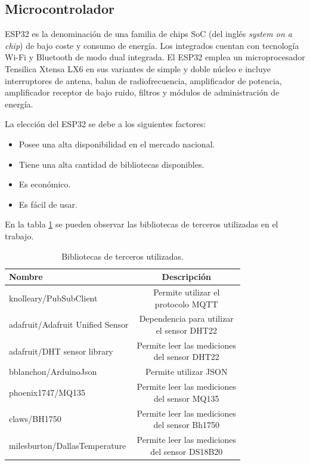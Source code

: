 \subsection{Microcontrolador}

ESP32 \citep{WEBSITE:ESP32} es la denominación de una familia de chips SoC (del inglés \textit{system on a chip}) \citep{WEBSITE:SOC} de bajo coste y consumo de energía. Los integrados cuentan con tecnología Wi-Fi y Bluetooth \citep{WEBSITE:BLUETOOTH} de modo dual integrada. El ESP32 emplea un microprocesador Tensilica Xtensa LX6 en sus variantes de simple y doble núcleo e incluye interruptores de antena, balun de radiofrecuencia, amplificador de potencia, amplificador receptor de bajo ruido, filtros y módulos de administración de energía.

La elección del ESP32 se debe a los siguientes factores: 
\begin{itemize}
	\item Posee una alta disponibilidad en el mercado nacional.
	\item Tiene una alta cantidad de bibliotecas disponibles.
	\item Es económico.
	\item Es fácil de usar.
\end{itemize}

En la tabla \ref{tab:tablaBibliotecasESP32} se pueden observar las bibliotecas de terceros utilizadas en el trabajo.

\begin{table}[H]
	\centering
	\caption[Bibliotecas de terceros utilizadas]{Bibliotecas de terceros utilizadas.}
	\begin{tabular}{l c}    
		\toprule
		\textbf{Nombre} & \textbf{Descripción}\\
		\midrule
		knolleary/PubSubClient \citep{WEBSITE:PUBSUBCLIENT} & \shortstack{Permite utilizar el \\ protocolo MQTT}\\	
		adafruit/Adafruit Unified Sensor \citep{WEBSITE:ADAFRUITUNIFIEDSENSOR}& \shortstack{Dependencia para utilizar \\ el sensor DHT22}\\	
		adafruit/DHT sensor library \citep{WEBSITE:DHTSENSORLIBRARY} & \shortstack{Permite leer las mediciones \\ del sensor DHT22}\\	
		bblanchon/ArduinoJson \citep{WEBSITE:ARDUINOJSON} & Permite utilizar JSON\\	
		phoenix1747/MQ135 \citep{WEBSITE:MQ135LIBRARY} & \shortstack{Permite leer las mediciones \\ del sensor MQ135}\\	
		claws/BH1750 \citep{WEBSITE:BH1750LIBRARY} & \shortstack{Permite leer las mediciones \\ del sensor Bh1750}\\	
		milesburton/DallasTemperature \citep{WEBSITE:ARDUINOTEMPERATURECONTROLLIBRARY} & \shortstack{Permite leer las mediciones \\ del sensor DS18B20}\\	
		\bottomrule
		\hline 
	\end{tabular}
	\label{tab:tablaBibliotecasESP32}
\end{table}

